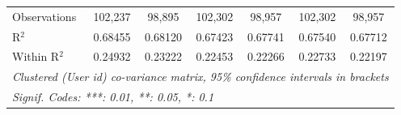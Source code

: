 \begin{table}[htbp]
\begin{threeparttable}[b]
\begin{tabular}{lcccccc}
         Observations                    & 102,237            & 98,895             & 102,302            & 98,957             & 102,302            & 98,957\\  
         R$^2$                           & 0.68455            & 0.68120            & 0.67423            & 0.67741            & 0.67540            & 0.67712\\  
         Within R$^2$                    & 0.24932            & 0.23222            & 0.22453            & 0.22266            & 0.22733            & 0.22197\\  
         \midrule \midrule
         \multicolumn{7}{l}{\emph{Clustered (User id) co-variance matrix, 95\% confidence intervals in brackets}}\\
         \multicolumn{7}{l}{\emph{Signif. Codes: ***: 0.01, **: 0.05, *: 0.1}}\\
      \end{tabular}
   \end{threeparttable}
\end{table}


